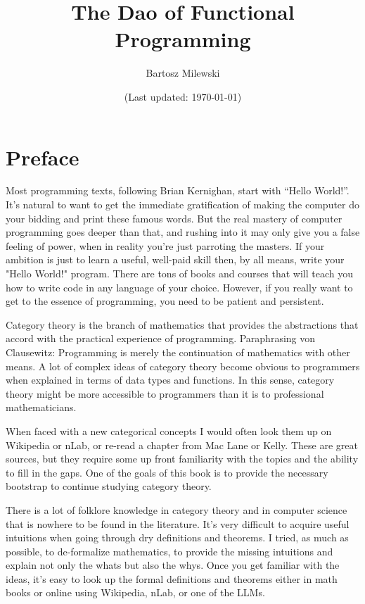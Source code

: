 \documentclass[11pt, book]{memoir}
\begin{document}
\setcounter{tocdepth}{4}
\setcounter{secnumdepth}{4}
\frontmatter

\title{\huge The Dao of Functional Programming}
\author{\Large Bartosz Milewski }

\date{\vfill (Last updated: \today)}

\maketitle

\tableofcontents

\clearpage

\section{Preface}

Most programming texts, following Brian Kernighan, start with ``Hello World!''. It's natural to want to get the immediate gratification of making the computer do your bidding and print these famous words. But the real mastery of computer programming goes deeper than that, and rushing into it may only give you a false feeling of power, when in reality you're just parroting the masters. If your ambition is just to learn a useful, well-paid skill then, by all means, write your "Hello World!" program. There are tons of books and courses that will teach you how to write code in any language of your choice. However, if you really want to get to the essence of programming, you need to be patient and persistent.

Category theory is the branch of mathematics that provides the abstractions that accord with the practical experience of programming. Paraphrasing von Clausewitz: Programming is merely the continuation of mathematics with other means. A lot of complex ideas of category theory become obvious to programmers when explained in terms of data types and functions. In this sense, category theory might be more accessible to programmers than it is to professional mathematicians.

When faced with a new categorical concepts I would often look them up on Wikipedia or nLab, or re-read a chapter from Mac Lane or Kelly. These are great sources, but they require some up front familiarity with the topics and the ability to fill in the gaps. One of the goals of this book is to provide the necessary bootstrap to continue studying category theory.

There is a lot of folklore knowledge in category theory and in computer science that is nowhere to be found in the literature. It's very difficult to acquire useful intuitions when going through dry definitions and theorems. I tried, as much as possible, to de-formalize mathematics, to provide the missing intuitions and explain not only the whats but also the whys. Once you get familiar with the ideas, it's easy to look up the formal definitions and theorems either in math books or online using Wikipedia, nLab, or one of the LLMs.
\end{document}
